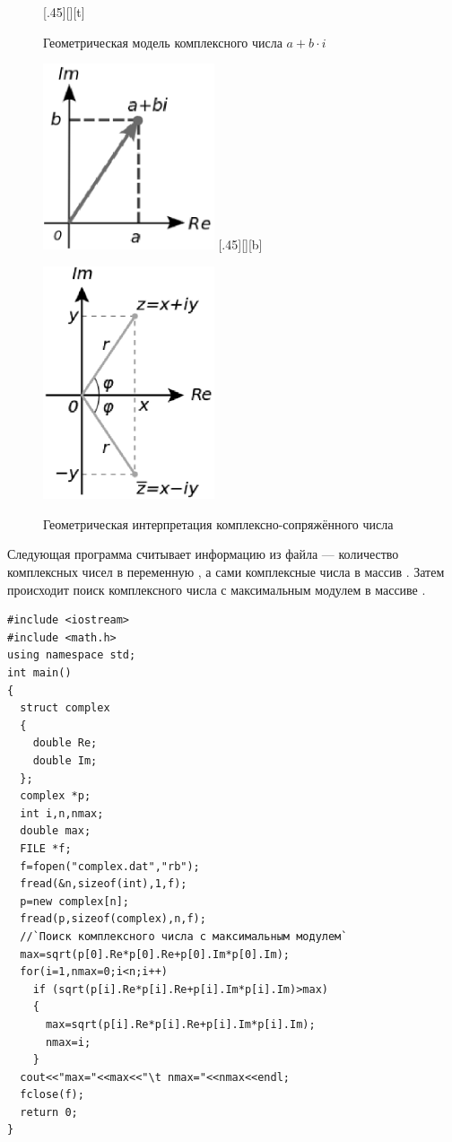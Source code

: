 \begin{figure}[H]
\begin{floatrow}
[.45\textwidth][\FBheight][t]
{\caption{Геометрическая  модель комплексного числа  $a+b\cdot i$}
\label{ch09:refDrawing0}}
{\includegraphics[width=0.45\textwidth,keepaspectratio]{img/ris_9_1}}\hspace*{0.05\textwidth}
%
[.45\textwidth][\FBheight][b]
{\caption{Геометрическая интерпретация комплексно-сопряжённого числа}
\label{ch09:refDrawing1}}
{\includegraphics[width=0.45\textwidth,keepaspectratio]{img/ris_9_2}}
\end{floatrow}
\end{figure}


Следующая программа считывает информацию из файла  --- количество комплексных
чисел в переменную , а сами комплексные числа в массив .
 Затем происходит поиск комплексного числа с максимальным модулем в массиве .

\begin{lstlisting}
#include <iostream>
#include <math.h>
using namespace std;
int main()
{
  struct complex
  {
    double Re;
    double Im;
  };
  complex *p;
  int i,n,nmax;
  double max;
  FILE *f;
  f=fopen("complex.dat","rb");
  fread(&n,sizeof(int),1,f);
  p=new complex[n];
  fread(p,sizeof(complex),n,f);
  //`Поиск комплексного числа с максимальным модулем`
  max=sqrt(p[0].Re*p[0].Re+p[0].Im*p[0].Im);
  for(i=1,nmax=0;i<n;i++)
    if (sqrt(p[i].Re*p[i].Re+p[i].Im*p[i].Im)>max)
    {
      max=sqrt(p[i].Re*p[i].Re+p[i].Im*p[i].Im);
      nmax=i;
    }
  cout<<"max="<<max<<"\t nmax="<<nmax<<endl;
  fclose(f);
  return 0;
}
\end{lstlisting}


